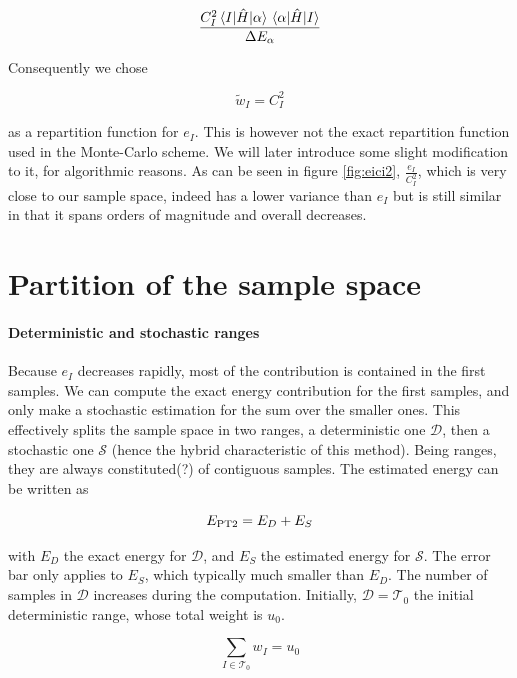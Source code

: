 \documentclass[./thesis.tex]{subfiles}
\begin{document}
\begin{equation}
\frac{C_I^2 \mel{I}{\hat{H}}{\alpha}\mel{\alpha}{\hat{H}}{I}}{\Delta E_{\alpha}}
\end{equation}

Consequently we chose

\begin{equation}
\tilde w_I = C_I^2
\end{equation}

as a repartition function for $e_I$. This is however not the exact repartition function used in the Monte-Carlo scheme. We will later introduce some slight modification to it, for algorithmic reasons.
As can be seen in figure \ref{fig:eici2}, $\frac{e_I}{C_I^2}$, which is very close to our sample space, indeed has a lower variance than $e_I$ but is still similar in that it spans orders of magnitude and overall decreases.

\section{Partition of the sample space}

\paragraph{Deterministic and stochastic ranges}
Because $e_I$ decreases rapidly, most of the contribution is contained in the first samples. We can compute the exact energy contribution for the first samples, and only make a stochastic estimation for the sum over the smaller ones. This effectively splits the sample space in two ranges, a deterministic one $\mathcal{D}$, then a stochastic one $\mathcal{S}$ (hence the hybrid characteristic of this method). Being ranges, they are always constituted(?) of contiguous samples. The estimated energy can be written as

\begin{equation}
E_\text{PT2} = E_D + E_S
\end{equation}

with $E_D$ the exact energy for $\mathcal{D}$, and $E_S$ the estimated energy for $\mathcal{S}$. The error bar only applies to $E_S$, which typically much smaller than $E_D$.
The number of samples in $\mathcal{D}$ increases during the computation. Initially, $\mathcal{D}=\mathcal{T}_0$ the initial deterministic range, whose total weight is $u_0$.

\begin{equation}
\sum_{I \in \mathcal{T}_0} w_I=u_0
\end{equation}
\end{document}
